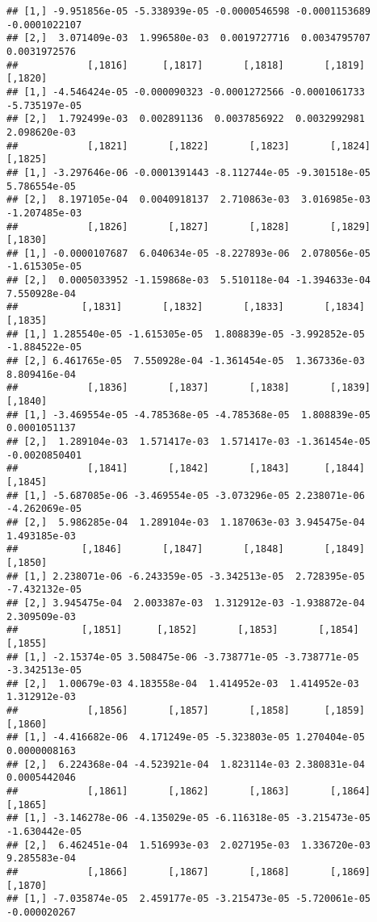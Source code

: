 \documentclass[
]{article}
\begin{document}
\begin{verbatim}
## [1,] -9.951856e-05 -5.338939e-05 -0.0000546598 -0.0001153689 -0.0001022107
## [2,]  3.071409e-03  1.996580e-03  0.0019727716  0.0034795707  0.0031972576
##            [,1816]      [,1817]       [,1818]       [,1819]       [,1820]
## [1,] -4.546424e-05 -0.000090323 -0.0001272566 -0.0001061733 -5.735197e-05
## [2,]  1.792499e-03  0.002891136  0.0037856922  0.0032992981  2.098620e-03
##            [,1821]       [,1822]       [,1823]       [,1824]       [,1825]
## [1,] -3.297646e-06 -0.0001391443 -8.112744e-05 -9.301518e-05  5.786554e-05
## [2,]  8.197105e-04  0.0040918137  2.710863e-03  3.016985e-03 -1.207485e-03
##            [,1826]       [,1827]       [,1828]       [,1829]       [,1830]
## [1,] -0.0000107687  6.040634e-05 -8.227893e-06  2.078056e-05 -1.615305e-05
## [2,]  0.0005033952 -1.159868e-03  5.510118e-04 -1.394633e-04  7.550928e-04
##           [,1831]       [,1832]       [,1833]       [,1834]       [,1835]
## [1,] 1.285540e-05 -1.615305e-05  1.808839e-05 -3.992852e-05 -1.884522e-05
## [2,] 6.461765e-05  7.550928e-04 -1.361454e-05  1.367336e-03  8.809416e-04
##            [,1836]       [,1837]       [,1838]       [,1839]       [,1840]
## [1,] -3.469554e-05 -4.785368e-05 -4.785368e-05  1.808839e-05  0.0001051137
## [2,]  1.289104e-03  1.571417e-03  1.571417e-03 -1.361454e-05 -0.0020850401
##            [,1841]       [,1842]       [,1843]      [,1844]       [,1845]
## [1,] -5.687085e-06 -3.469554e-05 -3.073296e-05 2.238071e-06 -4.262069e-05
## [2,]  5.986285e-04  1.289104e-03  1.187063e-03 3.945475e-04  1.493185e-03
##           [,1846]       [,1847]       [,1848]       [,1849]       [,1850]
## [1,] 2.238071e-06 -6.243359e-05 -3.342513e-05  2.728395e-05 -7.432132e-05
## [2,] 3.945475e-04  2.003387e-03  1.312912e-03 -1.938872e-04  2.309509e-03
##           [,1851]      [,1852]       [,1853]       [,1854]       [,1855]
## [1,] -2.15374e-05 3.508475e-06 -3.738771e-05 -3.738771e-05 -3.342513e-05
## [2,]  1.00679e-03 4.183558e-04  1.414952e-03  1.414952e-03  1.312912e-03
##            [,1856]       [,1857]       [,1858]      [,1859]      [,1860]
## [1,] -4.416682e-06  4.171249e-05 -5.323803e-05 1.270404e-05 0.0000008163
## [2,]  6.224368e-04 -4.523921e-04  1.823114e-03 2.380831e-04 0.0005442046
##            [,1861]       [,1862]       [,1863]       [,1864]       [,1865]
## [1,] -3.146278e-06 -4.135029e-05 -6.116318e-05 -3.215473e-05 -1.630442e-05
## [2,]  6.462451e-04  1.516993e-03  2.027195e-03  1.336720e-03  9.285583e-04
##            [,1866]       [,1867]       [,1868]       [,1869]      [,1870]
## [1,] -7.035874e-05  2.459177e-05 -3.215473e-05 -5.720061e-05 -0.000020267

\end{verbatim}
\end{document}
